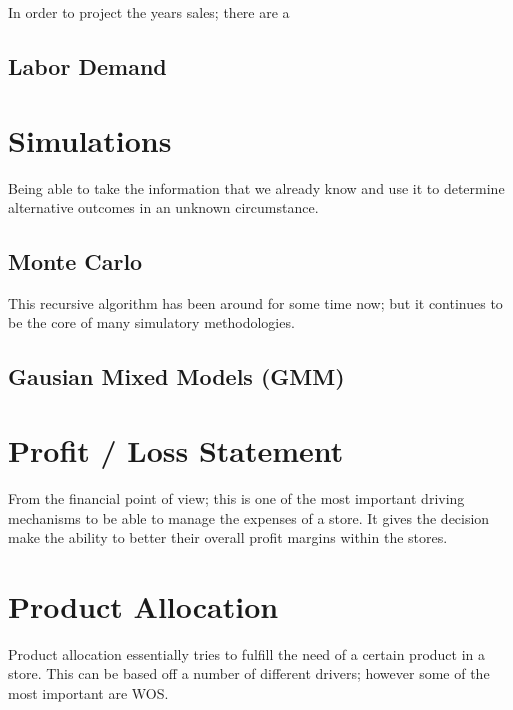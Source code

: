 \documentclass[]{book}
\theoremstyle{definition}
\theoremstyle{definition}
\theoremstyle{definition}
\theoremstyle{remark}
\begin{document}
In order to project the years sales; there are a

\hypertarget{labor-demand}{%
\section{Labor Demand}\label{labor-demand}}

\hypertarget{simulations}{%
\chapter{Simulations}\label{simulations}}

Being able to take the information that we already know and use it to
determine alternative outcomes in an unknown circumstance.

\hypertarget{monte-carlo}{%
\section{Monte Carlo}\label{monte-carlo}}

This recursive algorithm has been around for some time now; but it
continues to be the core of many simulatory methodologies.

\hypertarget{gausian-mixed-models-gmm}{%
\section{Gausian Mixed Models (GMM)}\label{gausian-mixed-models-gmm}}

\hypertarget{profit-loss-statement}{%
\chapter{Profit / Loss Statement}\label{profit-loss-statement}}

From the financial point of view; this is one of the most important
driving mechanisms to be able to manage the expenses of a store. It
gives the decision make the ability to better their overall profit
margins within the stores.

\hypertarget{product-allocation}{%
\chapter{Product Allocation}\label{product-allocation}}

Product allocation essentially tries to fulfill the need of a certain
product in a store. This can be based off a number of different drivers;
however some of the most important are WOS.
\end{document}
